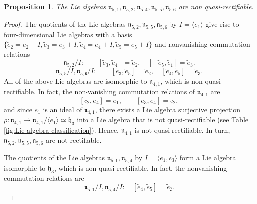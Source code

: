 \documentclass[12pt]{article}
\theoremstyle{plain}
\newtheorem{proposition}[theorem]{Proposition}
\theoremstyle{definition}
\numberwithin{equation}{section}
\begin{document}
\begin{proposition}
    The Lie algebras $\mathfrak{n}_{5,1},\mathfrak{n}_{5,2},\mathfrak{n}_{5,4},\mathfrak{n}_{5,5},\mathfrak{n}_{5,6}$ are non quasi-rectifiable.
\end{proposition}
\begin{proof}
    The quotients of the Lie algebras $\mathfrak{n}_{5,2},\mathfrak{n}_{5,5},\mathfrak{n}_{5,6}$ 
by $I=\langle e_1\rangle $ give rise to four-dimensional Lie algebras with a basis $\{\widetilde{e}_2=e_2+I,\widetilde{e}_3=e_3+I,\widetilde{e}_4=e_4+I,\widetilde{e}_5=e_5+I\}$ and nonvanishing commutation relations
$$
\mathfrak{n}_{5,2}/I:\qquad %
[\widetilde{e}_3,\widetilde{e}_4]=\widetilde{e}_2,  \quad [-\widetilde{e}_5,\widetilde{e}_4]=\widetilde{e}_3.
$$
$$
\mathfrak{n}_{5,5}/I, \mathfrak{n}_{5,6}/I:\qquad %
[\widetilde{e}_3,\widetilde{e}_5]=\widetilde{e}_2, \quad [\widetilde{e}_4,\widetilde{e}_5]=\widetilde{e}_3.
$$
All of the above Lie algebras are isomorphic to $\mathfrak{n}_{4,1}$, which is non quasi-rectifiable. In fact, the non-vanishing commutation relations of $\mathfrak{n}_{4,1}$ are
$$
[e_2,e_4]=e_1,\qquad [e_3,e_4]=e_2,
$$
and since $e_1$ is an ideal of $\mathfrak{n}_{4,1}$, there exists a Lie algebra surjective projection $\rho:\mathfrak{n}_{4,1}\rightarrow \mathfrak{n}_{4,1}/\langle e_1\rangle\simeq \mathfrak{h}_3$ into a Lie algebra that is not quasi-rectifiable (see Table \ref{fig:Lie-algebra-classification}). Hence, $\mathfrak{n}_{4,1}$ is not quasi-rectifiable. In turn, $\mathfrak{n}_{5,2},\mathfrak{n}_{5,5},\mathfrak{n}_{5,6}$ are not rectifiable.

The quotients of the Lie algebras $\mathfrak{n}_{5,1},\mathfrak{n}_{5,4}$ by $I=\langle e_1,e_3\rangle $ form a Lie algebra isomorphic to $\mathfrak{h}_{3}$, which is non quasi-rectifiable. In fact, the nonvanishing commutation relations are
$$
\mathfrak{n}_{5,1}/I, \mathfrak{n}_{5,4}/I:\quad %
[\widetilde{e}_4,\widetilde{e}_5]=\widetilde{e}_2.
$$\end{proof}
\end{document}
